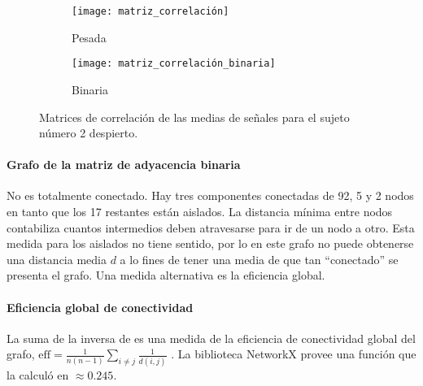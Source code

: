 \documentclass{article}
\begin{document}
\begin{figure}[ht]
	\centering
	\begin{subfigure}[b]{0.3\textwidth}
		\texttt{[image: matriz\_correlación]}
		\caption{Pesada}
		\label{fg:matriz_correlación_pesada}
	\end{subfigure}
	\begin{subfigure}[b]{0.25\textwidth}
		\texttt{[image: matriz\_correlación\_binaria]}
		\caption{Binaria}
		\label{fg:matriz_correlación_binaria}
	\end{subfigure}
	\caption{Matrices de correlación de las medias de señales para el sujeto número 2 despierto. 
	}
	\label{fg:matriz_correlación}
\end{figure}


\paragraph{Grafo de la matriz de adyacencia binaria}
No es totalmente conectado.
Hay tres componentes conectadas de 92, 5 y 2 nodos en tanto que los 17 restantes están aislados.
La distancia mínima entre nodos contabiliza cuantos intermedios deben atravesarse para ir de un nodo a otro.
Esta medida para los aislados no tiene sentido, por lo en este grafo no puede obtenerse una distancia media $d$ a lo fines de tener una media de que tan ``conectado'' se presenta el grafo.
Una medida alternativa es la eficiencia global.


\paragraph{Eficiencia global de conectividad}
La suma de la inversa de es una medida de la eficiencia de conectividad global del grafo, $\mathrm{eff} = \frac{1}{n (n-1)} \sum_{i \neq j} \frac{1}{d(i,j)}$ \cite{ek_global_2015}.
La biblioteca NetworkX provee una función que la calculó en $\approx 0.245$.
\end{document}
